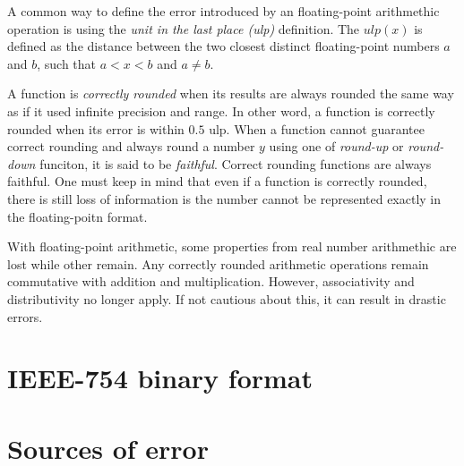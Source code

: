 A common way to define the error introduced by an floating-point arithmethic
operation is using the \textit{unit in the last place (ulp)} definition.
The $ulp(x)$ is defined as the distance between the two closest distinct
floating-point numbers $a$ and $b$, such that $a < x < b$ and $a \neq b$.

A function is \textit{correctly rounded} when its results are always rounded the 
same way as if it used infinite precision and range.
In other word, a function is correctly rounded when its error is within $0.5$ ulp.
When a function cannot guarantee correct rounding and always round a number $y$
using one of \textit{round-up} or \textit{round-down} funciton, it is said to be \textit{faithful}.
Correct rounding functions are always faithful.
One must keep in mind that even if a function is correctly rounded, there is
still loss of information is the number cannot be represented exactly in the
floating-poitn format.

With floating-point arithmetic, some properties from real number arithmethic are lost while other remain.
Any correctly rounded arithmetic operations remain commutative with addition and multiplication.
However, associativity and distributivity no longer apply.
If not cautious about this, it can result in drastic errors.


\section{IEEE-754 binary format}
\begin{comment}
    
\end{comment}


\section{Sources of error}
\begin{comment}
- rounding
- double rounding
- cancellation
- overflow & underflow
- accumulation
\end{comment}
